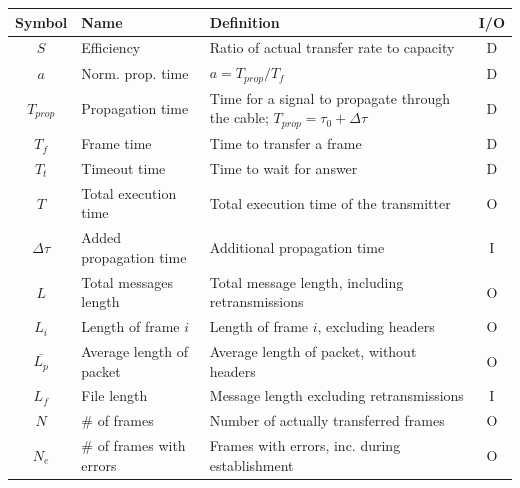 \documentclass[a4paper, 11pt]{report}
\begin{document}
\begin{center}
	\small
	\begin{tabular}{c | l | p{80mm} | c}
		\hline \hline
		\textbf{Symbol} & \textbf{Name}               & \textbf{Definition}                                                                & I/O \\ \hline
		$S$              & Efficiency                  & Ratio of actual transfer rate to capacity                                          & D   \\
		$a$              & Norm. prop. time            & $a = T_{prop}/T_f$                                                                 & D   \\
		$T_{prop}$       & Propagation time            & Time for a signal to propagate through the cable; $T_{prop} = \tau_0 + \Delta\tau$ & D   \\
		$T_f$            & Frame time                  & Time to transfer a frame                                                           & D   \\
		$T_t$            & Timeout time                & Time to wait for answer                                                            & D   \\
		$T$              & Total execution time        & Total execution time of the transmitter                                            & O   \\
		$\Delta\tau$     & Added propagation time      & Additional propagation time                                                        & I   \\
		$L$              & Total messages length       & Total message length, including retransmissions                                    & O   \\
		$L_i$            & Length of frame $i$         & Length of frame $i$, excluding headers                                             & O   \\
		$\overline{L_p}$ & Average length of packet    & Average length of packet, without headers                                          & O   \\
		$L_f$            & File length                 & Message length excluding retransmissions                                           & I   \\
		$N$				 & \# of frames                & Number of actually transferred frames                                              & O   \\
		$N_e$            & \# of frames with errors    & Frames with errors, inc. during establishment                                      & O   \\

\end{tabular}
\end{center}
\end{document}
